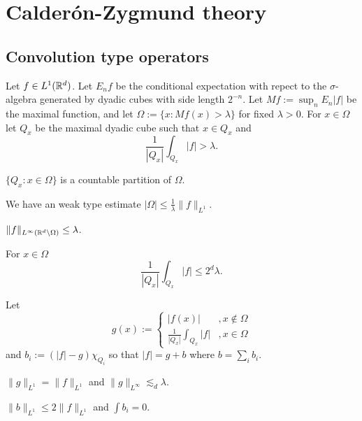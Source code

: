 \documentclass{../../large}
\begin{document}
\chapter{Calder\'on-Zygmund theory}


\section{Convolution type operators}
\begin{prb}
Let $f\in L^1(\mathbb{R}^d)$.
Let $E_nf$ be the conditional expectation with repect to the $\sigma$-algebra generated by dyadic cubes with side length $2^{-n}$.
Let $Mf:=\sup_nE_n|f|$ be the maximal function, and let $\Omega:=\{x:Mf(x)>\lambda\}$ for fixed $\lambda>0$.
For $x\in\Omega$ let $Q_x$ be the maximal dyadic cube such that $x\in Q_x$ and
\[\frac1{|Q_x|}\int_{Q_x}|f|>\lambda.\]
\begin{parts}
\item
$\{Q_x:x\in\Omega\}$ is a countable partition of $\Omega$.
\item
We have an weak type estimate $|\Omega|\le\frac1\lambda\|f\|_{L^1}$.
\item
$\|f\|_{L^\infty(\mathbb{R}^d\setminus\Omega)}\le\lambda$.
\item
For $x\in\Omega$
\[\frac1{|Q_x|}\int_{Q_x}|f|\le2^d\lambda.\]
\end{parts}
\end{prb}

\begin{prb}
Let
\[g(x):=\begin{cases}|f(x)|&,x\notin\Omega\\\frac1{|Q_x|}\int_{Q_x}|f|&,x\in\Omega\end{cases}\]
and $b_i:=(|f|-g)\chi_{Q_i}$ so that $|f|=g+b$ where $b=\sum_ib_i$.
\begin{parts}
\item $\|g\|_{L^1}=\|f\|_{L^1}$ and $\|g\|_{L^\infty}\lesssim_d\lambda$.
\item $\|b\|_{L^1}\le2\|f\|_{L^1}$ and $\int b_i=0$.
\end{parts}
\end{prb}
\begin{pf}

\end{pf}
\end{document}
